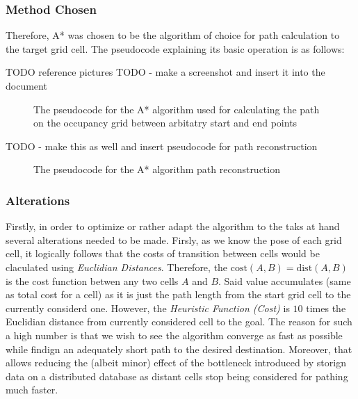 \documentclass[11pt, a4paper]{article}
\begin{document}
\subsubsection{Method Chosen} 

Therefore, A* was chosen to be the algorithm of choice for path calculation to the target grid cell. The pseudocode explaining its basic operation is as follows:

TODO reference pictures
TODO - make a screenshot and insert it into the document

\begin{figure}
	  \caption{The pseudocode for the A* algorithm used for calculating the path on the occupancy grid between arbitatry start and end points\cite{path_astar_pseudocode}}
\end{figure} 

TODO -  make this as well and insert pseudocode for path reconstruction

\begin{figure}
	  \caption{The pseudocode for the A* algorithm path reconstruction\cite{path_astar_grid_no_grid}}
\end{figure} 

\subsubsection{Alterations}
\label{Path Planning Algorihtm Alterations}

Firstly, in order to optimize or rather adapt the algorithm to the taks at hand several alterations needed to be made. Firsly, as we know the pose of each grid cell, it logically follows that the costs of transition between cells would be claculated using \textit{Euclidian Distances}. Therefore, the $\text{cost}(A,B)=\text{dist}(A,B)$ is the cost function betwen any two cells $A$ and $B$. Said value accumulates (same as total cost for a cell) as it is just the path length from the start grid cell to the currently considerd one. However, the \textit{Heuristic Function (Cost)} is $10$ times the Euclidian distance from currently considered cell to the goal. The reason for such a high number is that we wish to see the algorithm converge as fast as possible while findign an adequately short path to the desired destination. Moreover, that allows reducing the (albeit minor) effect of the bottleneck introduced by storign data on a distributed database as distant cells stop being considered for pathing much faster. 
\end{document}
